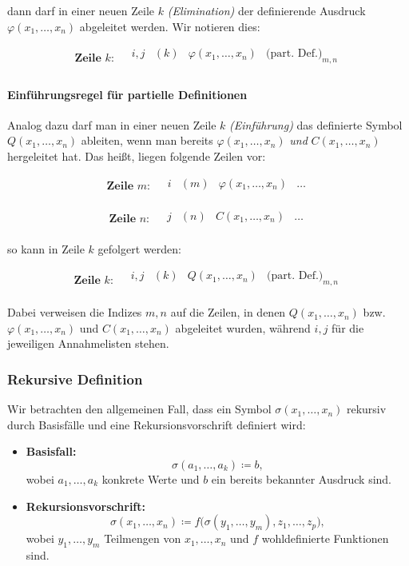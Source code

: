 \documentclass[main.tex]{subfiles}
\begin{document}
dann darf in einer neuen Zeile \(k\) \emph{(Elimination)} der definierende Ausdruck \(\varphi(x_1,\dots,x_n)\) abgeleitet werden. Wir notieren dies:

\[
\textbf{Zeile }k: 
\quad
\begin{array}{llll}
   i,j & (k) & \varphi(x_1,\dots,x_n) & \text{(part. Def.)}_{m,n} \\
\end{array}
\]

\paragraph{Einführungsregel für partielle Definitionen}
Analog dazu darf man in einer neuen Zeile \(k\) \emph{(Einf\"uhrung)} das definierte Symbol \(Q(x_1,\dots,x_n)\) ableiten, wenn man bereits \(\varphi(x_1,\dots,x_n)\) \emph{und} \(C(x_1,\dots,x_n)\) hergeleitet hat. Das hei\ss t, liegen folgende Zeilen vor:

\[
\textbf{Zeile }m: 
\quad
\begin{array}{llll}
   i & (m) & \varphi(x_1,\dots,x_n) & \dots \\
\end{array}
\]

\[
\textbf{Zeile }n: 
\quad
\begin{array}{llll}
   j & (n) & C(x_1,\dots,x_n) & \dots \\
\end{array}
\]

so kann in Zeile \(k\) gefolgert werden:

\[
\textbf{Zeile }k: 
\quad
\begin{array}{llll}
   i,j & (k) & Q(x_1,\dots,x_n) & \text{(part. Def.)}_{m,n} \\
\end{array}
\]

Dabei verweisen die Indizes \(m,n\) auf die Zeilen, in denen \(Q(x_1,\dots,x_n)\) bzw. \(\varphi(x_1,\dots,x_n)\) und \(C(x_1,\dots,x_n)\) abgeleitet wurden, während \(i,j\) für die jeweiligen Annahmelisten stehen.

\subsubsection{Rekursive Definition}
Wir betrachten den allgemeinen Fall, dass ein Symbol \(\sigma(x_1,\dots,x_n)\) rekursiv durch Basisfälle und eine Rekursionsvorschrift definiert wird:

\begin{definition}
\begin{itemize}
    \item \textbf{Basisfall:}
    \[
    \sigma(a_1, \ldots, a_k) \coloneqq b,
    \]
    wobei \(a_1, \ldots, a_k\) konkrete Werte und \(b\) ein bereits bekannter Ausdruck sind.
    \item \textbf{Rekursionsvorschrift:}
    \[
    \sigma(x_1, \ldots, x_n) \coloneqq f\big(\sigma(y_1, \ldots, y_m), z_1, \ldots, z_p\big),
    \]
    wobei \(y_1, \ldots, y_m\) Teilmengen von \(x_1, \ldots, x_n\) und \(f\) wohldefinierte Funktionen sind.
\end{itemize}
\end{definition}
\end{document}
